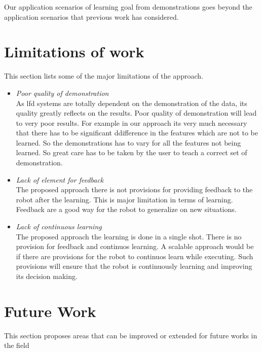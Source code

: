 Our application scenarios of learning goal from demonstrations goes beyond the
application scenarios that previous work has considered.

\newpage
\section{Limitations of work}

This section lists some of the major limitations of the approach.
\begin{itemize}
    \item \textit{Poor quality of demonstration} \\
As \acrshort{lfd} systems are totally dependent on the demonstration of the data, its 
quality greatly reflects on the results. Poor quality of demonstration will lead to 
very poor results. For example in our approach its very much necessary that there has 
to be significant ddifference in the features which are not to be learned. So the 
demonstrations has to vary for all the features not being learned. So great care has to 
be taken by the user to teach a correct set of demonstration.

    \item \textit{Lack of element for feedback} \\
The proposed approach there is not provisions for providing feedback to the robot after
the learning. This is major limitation in terms of learning. Feedback are a good way for 
the robot to generalize on new situations.

    \item \textit{Lack of continuous learning} \\
The proposed approach the learning is done in a single shot. There is no provision for 
feedback and continuos learning. A scalable approach would be if there are provisions 
for the robot to continuos learn while executing. Such provisions will ensure that the 
robot is continuously learning and improving its decision making.


\newpage

\end{itemize}
\section{Future Work}
This section proposes areas that can be improved or extended for future works 
in the field


